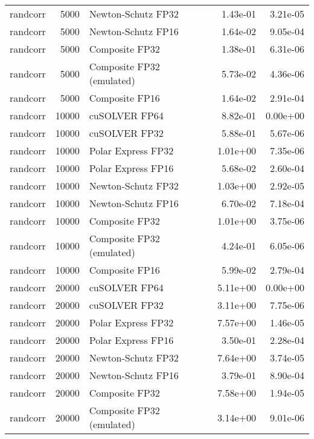 \begin{table}
\begin{tabular}{lrlrr}
 randcorr &  5000 &        Newton-Schutz FP32 &  1.43e-01 &        3.21e-05 \\
 randcorr &  5000 &        Newton-Schutz FP16 &  1.64e-02 &        9.05e-04 \\
 randcorr &  5000 &            Composite FP32 &  1.38e-01 &        6.31e-06 \\
 randcorr &  5000 & Composite FP32 (emulated) &  5.73e-02 &        4.36e-06 \\
 randcorr &  5000 &            Composite FP16 &  1.64e-02 &        2.91e-04 \\
 randcorr & 10000 &             cuSOLVER FP64 &  8.82e-01 &        0.00e+00 \\
 randcorr & 10000 &             cuSOLVER FP32 &  5.88e-01 &        5.67e-06 \\
 randcorr & 10000 &        Polar Express FP32 &  1.01e+00 &        7.35e-06 \\
 randcorr & 10000 &        Polar Express FP16 &  5.68e-02 &        2.60e-04 \\
 randcorr & 10000 &        Newton-Schutz FP32 &  1.03e+00 &        2.92e-05 \\
 randcorr & 10000 &        Newton-Schutz FP16 &  6.70e-02 &        7.18e-04 \\
 randcorr & 10000 &            Composite FP32 &  1.01e+00 &        3.75e-06 \\
 randcorr & 10000 & Composite FP32 (emulated) &  4.24e-01 &        6.05e-06 \\
 randcorr & 10000 &            Composite FP16 &  5.99e-02 &        2.79e-04 \\
 randcorr & 20000 &             cuSOLVER FP64 &  5.11e+00 &        0.00e+00 \\
 randcorr & 20000 &             cuSOLVER FP32 &  3.11e+00 &        7.75e-06 \\
 randcorr & 20000 &        Polar Express FP32 &  7.57e+00 &        1.46e-05 \\
 randcorr & 20000 &        Polar Express FP16 &  3.50e-01 &        2.28e-04 \\
 randcorr & 20000 &        Newton-Schutz FP32 &  7.64e+00 &        3.74e-05 \\
 randcorr & 20000 &        Newton-Schutz FP16 &  3.79e-01 &        8.90e-04 \\
 randcorr & 20000 &            Composite FP32 &  7.58e+00 &        1.94e-05 \\
 randcorr & 20000 & Composite FP32 (emulated) &  3.14e+00 &        9.01e-06 \\

\end{tabular}
\end{table}
